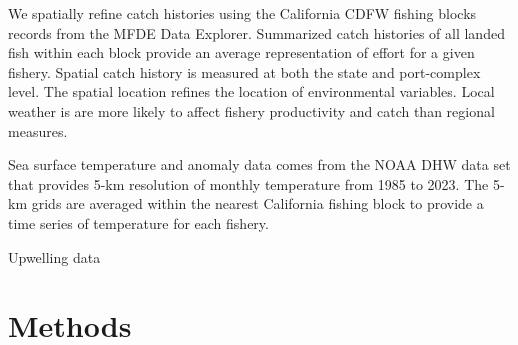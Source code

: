 \documentclass[
  letterpaper,
  DIV=11,
  numbers=noendperiod]{scrartcl}
\begin{document}
We spatially refine catch histories using the California CDFW fishing
blocks records from the MFDE Data Explorer. Summarized catch histories
of all landed fish within each block provide an average representation
of effort for a given fishery. Spatial catch history is measured at both
the state and port-complex level. The spatial location refines the
location of environmental variables. Local weather is are more likely to
affect fishery productivity and catch than regional measures.

Sea surface temperature and anomaly data comes from the NOAA DHW data
set that provides 5-km resolution of monthly temperature from 1985 to
2023. The 5-km grids are averaged within the nearest California fishing
block to provide a time series of temperature for each fishery.

Upwelling data

\hypertarget{methods}{%
\section*{Methods}\label{methods}}
\end{document}
